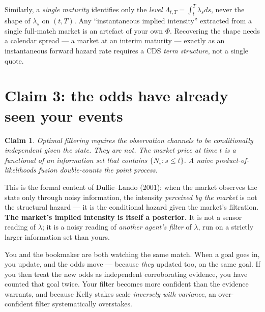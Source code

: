 \documentclass[11pt,a4paper]{article}
\theoremstyle{plain}
\newtheorem{claim}{Claim}
\begin{document}
\begin{point}
Similarly, a \emph{single maturity} identifies only the \emph{level} $\Lambda_{t,T}=\int_t^T\lambda_s ds$,
never the shape of $\lambda_s$ on $(t,T)$. Any ``instantaneous implied intensity'' extracted from a
single full-match market is an artefact of your own $\Phi$. Recovering the shape needs a calendar
spread --- a market at an interim maturity --- exactly as an instantaneous forward hazard rate
requires a CDS \emph{term structure}, not a single quote.
\end{point}

\section{Claim 3: the odds have already seen your events}

\begin{claim}
Optimal filtering requires the observation channels to be conditionally independent given the
state. They are not. The market price at time $t$ is a functional of an information set that
\emph{contains} $\{N_s : s\le t\}$. A naive product-of-likelihoods fusion double-counts the
point process.
\end{claim}

This is the formal content of Duffie--Lando (2001): when the market observes the state only
through noisy information, the intensity \emph{perceived by the market} is not the structural
hazard --- it is the conditional hazard given the market's filtration. \textbf{The market's
implied intensity is itself a posterior.} It is not a sensor reading of $\lambda$; it is a
noisy reading of \emph{another agent's filter} of $\lambda$, run on a strictly larger
information set than yours.

\begin{plain}
You and the bookmaker are both watching the same match. When a goal goes in, you update, and
the odds move --- because \emph{they} updated too, on the same goal. If you then treat the new
odds as independent corroborating evidence, you have counted that goal twice. Your filter
becomes more confident than the evidence warrants, and because Kelly stakes scale
\emph{inversely with variance}, an over-confident filter systematically overstakes.
\end{plain}
\end{document}
